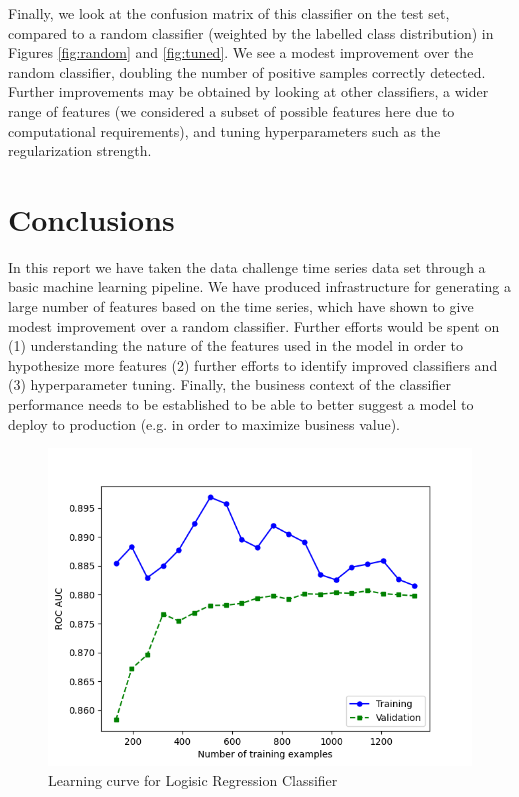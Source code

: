 \documentclass[12pt]{article}
\begin{document}
Finally, we look at the confusion matrix of this classifier on the test set, compared to a random classifier (weighted by the labelled class distribution) in Figures \ref{fig:random} and \ref{fig:tuned}. We see a modest improvement over the random classifier, doubling the number of positive samples correctly detected. Further improvements may be obtained by looking at other classifiers, a wider range of features (we considered a subset of possible features here due to computational requirements), and tuning hyperparameters such as the regularization strength. 

\section{Conclusions}
In this report we have taken the data challenge time series data set through a basic machine learning pipeline. We have produced infrastructure for generating a large number of features based on the time series, which have shown to give modest improvement over a random classifier. Further efforts would be spent on (1) understanding the nature of the features used in the model in order to hypothesize more features (2) further efforts to identify improved classifiers and (3) hyperparameter tuning. Finally, the business context of the classifier performance needs to be established to be able to better suggest a model to deploy to production (e.g. in order to maximize business value). 


\begin{figure}
\centering
\includegraphics[width=1\textwidth]{learning.png}
\caption{Learning curve for Logisic Regression Classifier}
\label{fig:learning}
\end{figure}
\end{document}
